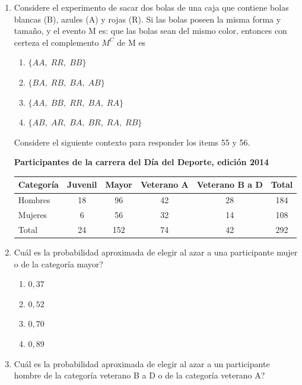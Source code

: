 \documentclass[12pt]{article}
\begin{document}
\begin{enumerate}[label=\textbf{\arabic*.}, itemsep=2.5cm]
\Needspace{0.45\textheight}
\item
Considere el experimento de sacar dos bolas de una caja que contiene bolas blancas (B), azules (A) y rojas (R). Si las bolas poseen la misma forma y tama\~no, y el evento M es: que las bolas sean del mismo color, entonces con certeza el complemento $M^{C}$ de M es

\begin{enumerate}[label=\Alph*)]
  \item $\{AA,\; RR,\; BB\}$
  \item $\{BA,\; RB,\; BA,\; AB\}$
  \item $\{AA,\; BB,\; RR,\; BA,\; RA\}$
  \item $\{AB,\; AR,\; BA,\; BR,\; RA,\; RB\}$
\end{enumerate}

\Needspace{0.65\textheight}
Considere el siguiente contexto para responder los items 55 y 56.

\begin{center}
\textbf{Participantes de la carrera del D\'ia del Deporte, edici\'on 2014}

\vspace{4pt}
\begin{tabular}{|l|c|c|c|c|c|}
\hline
\textbf{Categor\'ia} & \textbf{Juvenil} & \textbf{Mayor} & \textbf{Veterano A} & \textbf{Veterano B a D} & \textbf{Total} \\
\hline
Hombres & 18 & 96  & 42 & 28 & 184 \\
Mujeres & 6  & 56  & 32 & 14 & 108 \\
Total   & 24 & 152 & 74 & 42 & 292 \\
\hline
\end{tabular}
\end{center}

\item
\textquestiondown Cu\'al es la probabilidad aproximada de elegir al azar a una participante mujer o de la categor\'ia mayor?

\begin{enumerate}[label=\Alph*)]
  \item $0{,}37$
  \item $0{,}52$
  \item $0{,}70$
  \item $0{,}89$
\end{enumerate}

\item
\textquestiondown Cu\'al es la probabilidad aproximada de elegir al azar a un participante hombre de la categor\'ia veterano B a D o de la categor\'ia veterano A?


\end{enumerate}
\end{document}
